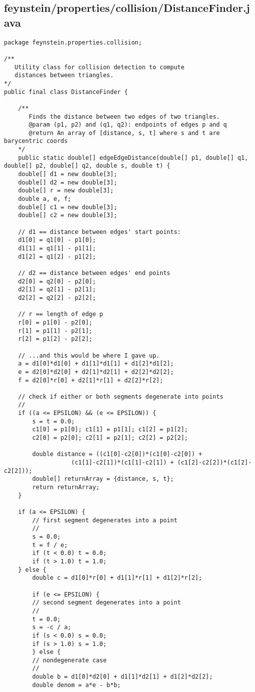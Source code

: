 \subsection*{feynstein/properties/collision/DistanceFinder.java}
\begin{lstlisting}
package feynstein.properties.collision;

/**
   Utility class for collision detection to compute
   distances between triangles.
*/
public final class DistanceFinder {

    /**
       Finds the distance between two edges of two triangles.
       @param (p1, p2) and (q1, q2): endpoints of edges p and q
       @return An array of [distance, s, t] where s and t are barycentric coords
    */
    public static double[] edgeEdgeDistance(double[] p1, double[] q1, double[] p2, double[] q2, double s, double t) {
	double[] d1 = new double[3];
	double[] d2 = new double[3];
	double[] r = new double[3];
	double a, e, f;
	double[] c1 = new double[3];
	double[] c2 = new double[3];
	
	// d1 == distance between edges' start points:
	d1[0] = q1[0] - p1[0];
	d1[1] = q1[1] - p1[1];
	d1[2] = q1[2] - p1[2];
	
	// d2 == distance between edges' end points
	d2[0] = q2[0] - p2[0];
	d2[1] = q2[1] - p2[1];
	d2[2] = q2[2] - p2[2];

	// r == length of edge p
	r[0] = p1[0] - p2[0];
	r[1] = p1[1] - p2[1];
	r[2] = p1[2] - p2[2];
	
	// ...and this would be where I gave up.
	a = d1[0]*d1[0] + d1[1]*d1[1] + d1[2]*d1[2];
	e = d2[0]*d2[0] + d2[1]*d2[1] + d2[2]*d2[2];
	f = d2[0]*r[0] + d2[1]*r[1] + d2[2]*r[2];
	
	// check if either or both segments degenerate into points
	//
	if ((a <= EPSILON) && (e <= EPSILON)) {
	    s = t = 0.0;
	    c1[0] = p1[0]; c1[1] = p1[1]; c1[2] = p1[2];
	    c2[0] = p2[0]; c2[1] = p2[1]; c2[2] = p2[2];

	    double distance = ((c1[0]-c2[0])*(c1[0]-c2[0]) +
			       (c1[1]-c2[1])*(c1[1]-c2[1]) + (c1[2]-c2[2])*(c1[2]-c2[2]));
	    double[] returnArray = {distance, s, t};
	    return returnArray;
	}

	if (a <= EPSILON) {
	    // first segment degenerates into a point
	    //
	    s = 0.0;
	    t = f / e;
	    if (t < 0.0) t = 0.0;
	    if (t > 1.0) t = 1.0;
	} else {
	    double c = d1[0]*r[0] + d1[1]*r[1] + d1[2]*r[2];
	    
	    if (e <= EPSILON) {
		// second segment degenerates into a point
		//
		t = 0.0;
		s = -c / a;
		if (s < 0.0) s = 0.0;
		if (s > 1.0) s = 1.0;
	    } else {
		// nondegenerate case
		//
		double b = d1[0]*d2[0] + d1[1]*d2[1] + d1[2]*d2[2];
		double denom = a*e - b*b;
	    

\end{lstlisting}

